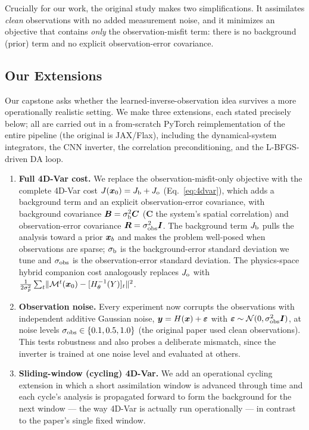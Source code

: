 Crucially for our work, the original study makes two simplifications. It assimilates \emph{clean} observations with no added measurement noise, and it minimizes an objective that contains \emph{only} the observation-misfit term: there is no background (prior) term and no explicit observation-error covariance.

\subsection{Our Extensions}

Our capstone asks whether the learned-inverse-observation idea survives a more operationally realistic setting. We make three extensions, each stated precisely below; all are carried out in a from-scratch PyTorch reimplementation of the entire pipeline (the original is JAX/Flax), including the dynamical-system integrators, the CNN inverter, the correlation preconditioning, and the L-BFGS-driven DA loop.

\begin{enumerate}
  \item \textbf{Full 4D-Var cost.} We replace the observation-misfit-only objective with the complete 4D-Var cost $J(\bm{x}_0) = J_{\mathrm{b}} + J_{\mathrm{o}}$ (Eq.~\eqref{eq:4dvar}), which adds a background term and an explicit observation-error covariance, with background covariance $\bm{B} = \sigma_{\mathrm{b}}^2 \bm{C}$ ($\bm{C}$ the system's spatial correlation) and observation-error covariance $\bm{R} = \sigma_{\mathrm{obs}}^2 \bm{I}$. The background term $J_{\mathrm{b}}$ pulls the analysis toward a prior $\bm{x}_b$ and makes the problem well-posed when observations are sparse; $\sigma_{\mathrm{b}}$ is the background-error standard deviation we tune and $\sigma_{\mathrm{obs}}$ is the observation-error standard deviation. The physics-space hybrid companion cost analogously replaces $J_{\mathrm{o}}$ with $\tfrac{1}{2\sigma_p^2}\sum_t \lVert \mathcal{M}^t(\bm{x}_0) - [H^{-1}_{\theta}(Y)]_t\rVert^2$.

  \item \textbf{Observation noise.} Every experiment now corrupts the observations with independent additive Gaussian noise, $\bm{y} = H(\bm{x}) + \boldsymbol\varepsilon$ with $\boldsymbol\varepsilon \sim \mathcal{N}(0, \sigma_{\mathrm{obs}}^2 \bm{I})$, at noise levels $\sigma_{\mathrm{obs}} \in \{0.1, 0.5, 1.0\}$ (the original paper used clean observations). This tests robustness and also probes a deliberate mismatch, since the inverter is trained at one noise level and evaluated at others.

  \item \textbf{Sliding-window (cycling) 4D-Var.} We add an operational cycling extension in which a short assimilation window is advanced through time and each cycle's analysis is propagated forward to form the background for the next window --- the way 4D-Var is actually run operationally --- in contrast to the paper's single fixed window.
\end{enumerate}

